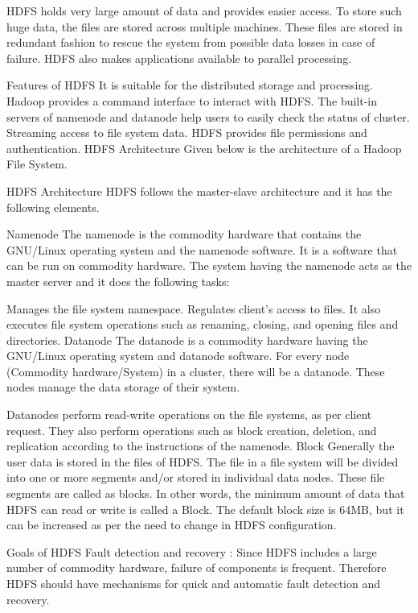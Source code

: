 HDFS holds very large amount of data and provides easier access. To store such huge data, the files are stored across multiple machines. These files are stored in redundant fashion to rescue the system from possible data losses in case of failure. HDFS also makes applications available to parallel processing.

Features of HDFS
It is suitable for the distributed storage and processing.
Hadoop provides a command interface to interact with HDFS.
The built-in servers of namenode and datanode help users to easily check the status of cluster.
Streaming access to file system data.
HDFS provides file permissions and authentication.
HDFS Architecture
Given below is the architecture of a Hadoop File System.

HDFS Architecture
HDFS follows the master-slave architecture and it has the following elements.

Namenode
The namenode is the commodity hardware that contains the GNU/Linux operating system and the namenode software. It is a software that can be run on commodity hardware. The system having the namenode acts as the master server and it does the following tasks:

Manages the file system namespace.
Regulates client’s access to files.
It also executes file system operations such as renaming, closing, and opening files and directories.
Datanode
The datanode is a commodity hardware having the GNU/Linux operating system and datanode software. For every node (Commodity hardware/System) in a cluster, there will be a datanode. These nodes manage the data storage of their system.

Datanodes perform read-write operations on the file systems, as per client request.
They also perform operations such as block creation, deletion, and replication according to the instructions of the namenode.
Block
Generally the user data is stored in the files of HDFS. The file in a file system will be divided into one or more segments and/or stored in individual data nodes. These file segments are called as blocks. In other words, the minimum amount of data that HDFS can read or write is called a Block. The default block size is 64MB, but it can be increased as per the need to change in HDFS configuration.

Goals of HDFS
Fault detection and recovery : Since HDFS includes a large number of commodity hardware, failure of components is frequent. Therefore HDFS should have mechanisms for quick and automatic fault detection and recovery.

